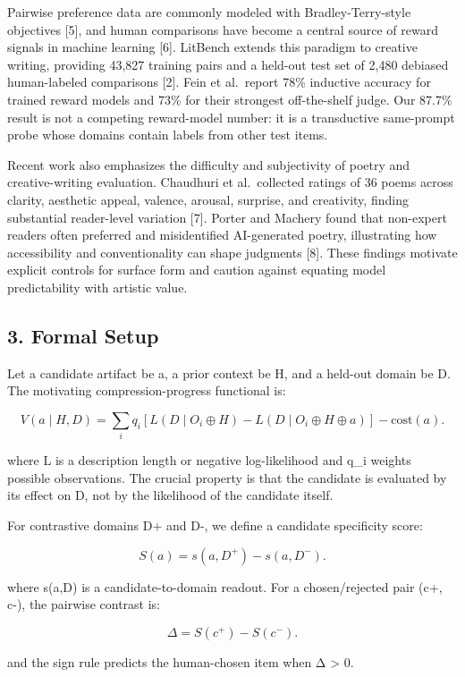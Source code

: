 \documentclass[
]{article}
\begin{document}
Pairwise preference data are commonly modeled with Bradley-Terry-style
objectives {[}5{]}, and human comparisons have become a central source
of reward signals in machine learning {[}6{]}. LitBench extends this
paradigm to creative writing, providing 43,827 training pairs and a
held-out test set of 2,480 debiased human-labeled comparisons {[}2{]}.
Fein et al.~report 78\% inductive accuracy for trained reward models and
73\% for their strongest off-the-shelf judge. Our 87.7\% result is not a
competing reward-model number: it is a transductive same-prompt probe
whose domains contain labels from other test items.

Recent work also emphasizes the difficulty and subjectivity of poetry
and creative-writing evaluation. Chaudhuri et al.~collected ratings of
36 poems across clarity, aesthetic appeal, valence, arousal, surprise,
and creativity, finding substantial reader-level variation {[}7{]}.
Porter and Machery found that non-expert readers often preferred and
misidentified AI-generated poetry, illustrating how accessibility and
conventionality can shape judgments {[}8{]}. These findings motivate
explicit controls for surface form and caution against equating model
predictability with artistic value.

\subsection{3. Formal Setup}\label{formal-setup}

Let a candidate artifact be a, a prior context be H, and a held-out
domain be D. The motivating compression-progress functional is:

\[V(a\mid H,D)=\sum_i q_i[L(D\mid O_i\oplus H)-L(D\mid O_i\oplus H\oplus a)]-\mathrm{cost}(a).\]

where L is a description length or negative log-likelihood and q\_i
weights possible observations. The crucial property is that the
candidate is evaluated by its effect on D, not by the likelihood of the
candidate itself.

For contrastive domains D+ and D-, we define a candidate specificity
score:

\[S(a)=s(a,D^+)-s(a,D^-).\]

where s(a,D) is a candidate-to-domain readout. For a chosen/rejected
pair (c+, c-), the pairwise contrast is:

\[\Delta=S(c^+)-S(c^-).\]

and the sign rule predicts the human-chosen item when Δ \textgreater{}
0.
\end{document}
